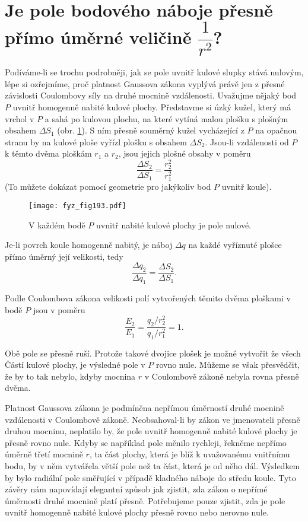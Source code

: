 \section{Je pole bodového náboje přesně přímo úměrné veličině 
             \texorpdfstring{\fontsize{8pt}{9pt}\selectfont\(\dfrac{1}{r^2}\)}{1/r^2}?}\label{fyz:IIchapVsecVII}
              
  Podíváme-li se trochu podrobněji, jak se pole uvnitř kulové slupky stává nulovým, lépe si 
  ozřejmíme, proč platnost Gaussova zákona vyplývá právě jen z přesné závislosti Coulombovy 
  síly na druhé mocnině vzdálenosti. Uvažujme nějaký bod \(P\) uvnitř homogenně nabité kulové 
  plochy. Představme si úzký kužel, který má vrchol v \(P\) a sahá po kulovou plochu, na které 
  vytíná malou plošku s plošným obsahem \(\Delta S_1\) (obr. \ref{fyz:fig193}). 
  S ním přesně souměrný kužel vycházející z \(P\) na opačnou stranu by na kulové ploše vyřízl 
  plošku s obsahem \(\Delta S_2\). Jsou-li vzdálenosti od \(P\) k těmto dvěma ploškám \(r_1\) a 
  \(r_2\), jsou jejich plošné obsahy v poměru \[\frac{\Delta S_2}{\Delta S_1} = 
  \frac{r_2^2}{r_1^2}\] (To můžete dokázat pomocí geometrie pro jakýkoliv bod \(P\) uvnitř 
  koule).

  \begin{figure}[ht!] %
    \centering
    \texttt{[image: fyz\_fig193.pdf]}
    \caption{V každém bodě \(P\) uvnitř nabité kulové plochy je pole nulové.}
    \label{fyz:fig193}
  \end{figure}
  Je-li povrch koule homogenně nabitý, je náboj \(\Delta q\) na každé vyříznuté plošce přímo 
  úměrný její velikosti, tedy \[\frac{\Delta q_2}{\Delta q_1} = \frac{\Delta S_2}{\Delta S_1}.\]
  
  Podle Coulombova zákona velikosti polí vytvořených těmito dvěma ploškami v bodě \(P\) jsou v 
  poměru \[\frac{E_2}{E_1} = \frac{q_2/r_2^2}{q_1/r_1^2} = 1.\]
  
  Obě pole se přesně ruší. Protože takové dvojice plošek je možné vytvořit že všech Částí 
  kulové plochy, je výsledné pole v \(P\) rovno nule. Můžeme se však přesvědčit, že by to tak 
  nebylo, kdyby mocnina \(r\) v Coulombově zákoně nebyla rovna přesně dvěma.
  
  Platnost Gaussova zákona je podmíněna nepřímou úměrností druhé mocnině vzdálenosti v 
  Coulombově zákoně. Neob\-sahoval-li by zákon ve jmenovateli přesně druhou mocninu, neplatilo 
  by, že pole uvnitř homogenně nabité kulové plochy je přesně rovno nule. Kdyby se například 
  pole měnilo rychleji, řekněme nepřímo úměrně třetí mocnině \(r\), ta část plochy, která je 
  blíž k uvažovanému vnitřnímu bodu, by v něm vytvářela větší pole než ta část, která je od 
  něho dál. Výsledkem by bylo radiální pole směřující v případě kladného náboje do středu 
  koule. Tyto závěry nám napovídají elegantní způsob jak zjistit, zda zákon o nepřímé úměrnosti 
  druhé mocnině platí přesně. Potřebujeme pouze zjistit, zda je pole uvnitř homogenně nabité 
  kulové plochy přesně rovno nebo nerovno nule.
  
